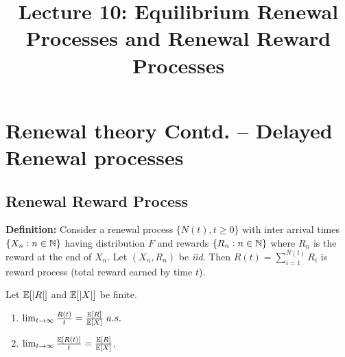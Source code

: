 \documentclass[a4paper,10pt,english]{article}
\title{Lecture 10: Equilibrium Renewal Processes and Renewal Reward Processes}
\author{}
\begin{document}
\maketitle
\section{Renewal theory Contd. -- Delayed Renewal processes }
\subsection{Renewal Reward Process}
\textbf{Definition:} Consider a renewal process $\{N(t), t \geq 0\}$ with inter arrival times $\{X_n: n \in \mathbb{N}\}$ having distribution $F$ and rewards $\{R_n: n \in \mathbb{N}\}$ where $R_n$ is the reward at the end of $X_n$. Let $(X_n,R_n)$ be \emph{iid}. Then $R(t)=\sum_{i=1}^{N(t)}R_i$ is reward process (total reward earned by time $t$). 
\begin{thm}
	\label{theorem}
Let $\mathbb{E}[|R|]$ and $\mathbb{E}[|X|]$ be finite.
\begin{enumerate}
\item $\lim_{t \rightarrow \infty} \frac{R(t)}{t} = \frac{\mathbb{E}[R]}{\mathbb{E}[X]} ~a.s.$
\item  $\lim_{t \rightarrow \infty} \frac{\mathbb{E}[R(t)]}{t} = \frac{\mathbb{E}[R]}{\mathbb{E}[X]}$.
\end{enumerate}
\end{thm}
\end{document}
